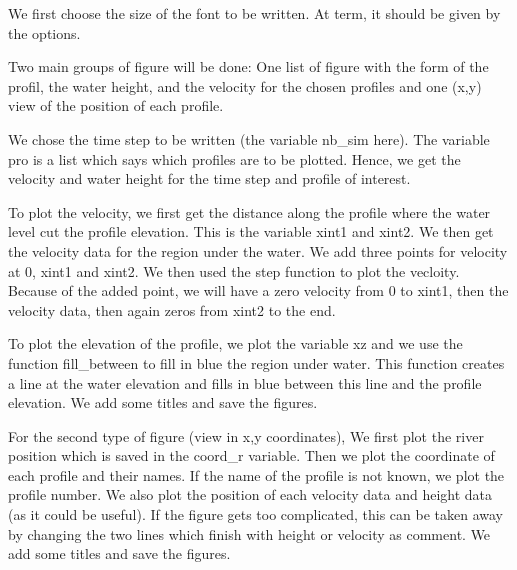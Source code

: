 \documentclass[letterpaper,10pt,english]{sphinxmanual}
\begin{document}
\begin{fulllineitems}
\begin{quote}
\begin{description}
\begin{itemize}
\end{itemize}

\end{description}\end{quote}


We first choose the size of the font to be written. At term, it should be given by the options.

Two main groups of figure will be done: One list of figure with the form of the profil, the water height, and the
velocity for the chosen profiles and one (x,y) view of the position of each profile.

We chose the time step to be written (the variable nb\_sim here). The variable pro is a list which says which
profiles are to be plotted. Hence, we get the velocity and water height for the time step and profile of interest.

To plot the velocity, we first get the distance along the profile where the water level cut the profile elevation.
This is the variable xint1 and xint2. We then get the velocity data for the region under the water. We add three
points for velocity at 0, xint1 and xint2. We then used the step function to plot the vecloity. Because of the added
point, we will have a zero velocity from 0 to xint1, then the velocity data, then again zeros from xint2 to the end.

To plot the elevation of the profile, we plot the variable xz and we use the function fill\_between to fill
in blue the region under water. This function creates a line at the water elevation and fills in blue between this
line and the profile elevation. We add some titles and save the figures.

For the second type of figure (view in x,y coordinates), We first plot the river position which is saved in the
coord\_r variable. Then we plot the coordinate of each profile and their names. If the name of the profile is not
known, we plot the profile number.  We also plot the position of each velocity data and height data (as it could be
useful). If the figure gets too complicated, this can be taken away by changing the two lines which finish
with height or velocity as comment.  We add some titles and save the figures.

\end{fulllineitems}

\end{document}
